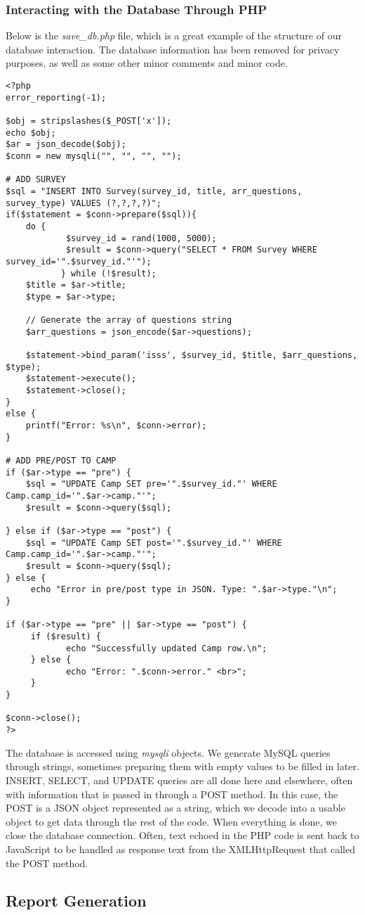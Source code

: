 \documentclass[../final.tex]{subfiles}
\begin{document}
\subsubsection{Interacting with the Database Through PHP}
Below is the \emph{save\_db.php} file, which is a great example of the structure of our database interaction.
The database information has been removed for privacy purposes, as well as some other minor comments and minor code.
\begin{lstlisting}
<?php
error_reporting(-1);

$obj = stripslashes($_POST['x']);
echo $obj;
$ar = json_decode($obj);
$conn = new mysqli("", "", "", "");

# ADD SURVEY
$sql = "INSERT INTO Survey(survey_id, title, arr_questions, survey_type) VALUES (?,?,?,?)";
if($statement = $conn->prepare($sql)){
	do {
           	$survey_id = rand(1000, 5000);
           	$result = $conn->query("SELECT * FROM Survey WHERE survey_id='".$survey_id."'");
           } while (!$result);
	$title = $ar->title;
	$type = $ar->type;

	// Generate the array of questions string
	$arr_questions = json_encode($ar->questions);

	$statement->bind_param('isss', $survey_id, $title, $arr_questions, $type);
	$statement->execute();
	$statement->close();
}
else {
	printf("Error: %s\n", $conn->error);
}

# ADD PRE/POST TO CAMP
if ($ar->type == "pre") {
   	$sql = "UPDATE Camp SET pre='".$survey_id."' WHERE Camp.camp_id='".$ar->camp."'";	
	$result = $conn->query($sql);

} else if ($ar->type == "post") {
   	$sql = "UPDATE Camp SET post='".$survey_id."' WHERE Camp.camp_id='".$ar->camp."'";
   	$result = $conn->query($sql);
} else {
  	 echo "Error in pre/post type in JSON. Type: ".$ar->type."\n";
}

if ($ar->type == "pre" || $ar->type == "post") {
  	 if ($result) {
      		echo "Successfully updated Camp row.\n";
  	 } else {
      		echo "Error: ".$conn->error." <br>";
  	 }
}

$conn->close();
?>
\end{lstlisting}
The database is accessed using \emph{mysqli} objects.
We generate MySQL queries through strings, sometimes preparing them with empty values to be filled in later.
INSERT, SELECT, and UPDATE queries are all done here and elsewhere, often with information that is passed in through a POST method.
In this case, the POST is a JSON object represented as a string, which we decode into a usable object to get data through the rest of the code.
When everything is done, we close the database connection.
Often, text echoed in the PHP code is sent back to JavaScript to be handled as response text from the XMLHttpRequest that called the POST method.
\subsection{Report Generation}
\end{document}
